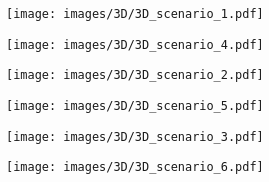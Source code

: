 \begin{subfigure}[b]{0.3\textwidth}
    \centering
    \texttt{[image: images/3D/3D\_scenario\_1.pdf]}
    \caption{}
    \texttt{[image: images/3D/3D\_scenario\_4.pdf]}
    \caption{}
    \label{fig:3D1}
\end{subfigure}
\begin{subfigure}[b]{0.3\textwidth}
    \centering
    \texttt{[image: images/3D/3D\_scenario\_2.pdf]}
    \caption{}
    \texttt{[image: images/3D/3D\_scenario\_5.pdf]}
    \caption{}
    \label{fig:3D2}
\end{subfigure}
\begin{subfigure}[b]{0.3\textwidth}
    \centering
    \texttt{[image: images/3D/3D\_scenario\_3.pdf]}
    \caption{}
    \texttt{[image: images/3D/3D\_scenario\_6.pdf]}
    \caption{}
    \label{fig:3D3}
\end{subfigure}
